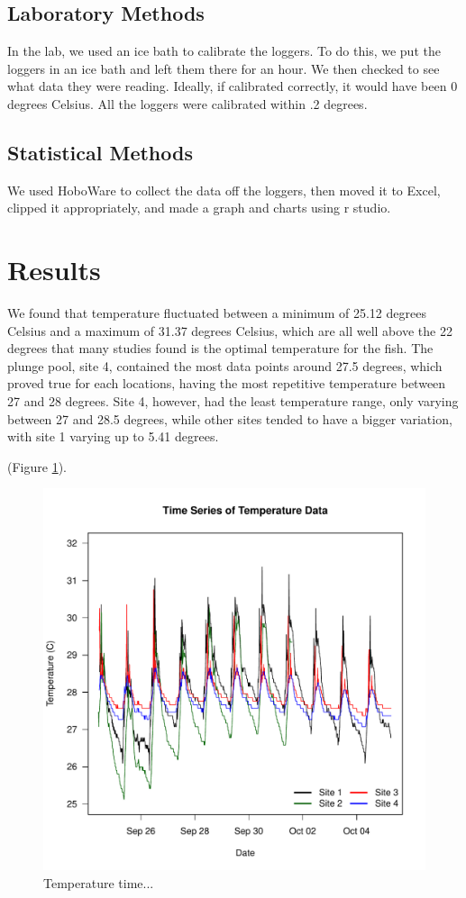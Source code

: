 \documentclass{article}\usepackage[]{graphicx}\usepackage[]{color}
\begin{document}
\subsection{Laboratory Methods}

In the lab, we used an ice bath to calibrate the loggers. To do this, we put the loggers in an ice bath and left them there for an hour. We then checked to see what data they were reading. Ideally, if calibrated correctly, it would have been 0 degrees Celsius. All the loggers were calibrated within .2 degrees.

\subsection{Statistical Methods}

We used HoboWare to collect the data off the loggers, then moved it to Excel, clipped it appropriately, and made a graph and charts using r studio. 

\section{Results}

  We found that temperature fluctuated between a minimum of 25.12 degrees Celsius and a maximum of 31.37 degrees Celsius, which are all well above the 22 degrees that many studies found is the optimal temperature for the fish. The plunge pool, site 4, contained the most data points around 27.5 degrees, which proved true for each locations, having the most repetitive temperature between 27 and 28 degrees. Site 4, however, had the least temperature range, only varying between 27 and 28.5 degrees, while other sites tended to have a bigger variation, with site 1 varying up to 5.41 degrees. 
  
(Figure \ref{Temp}).

\begin{figure}
\includegraphics{Figures/Temp}
\caption{Temperature time...}
\label{Temp}
\end{figure}
\end{document}
